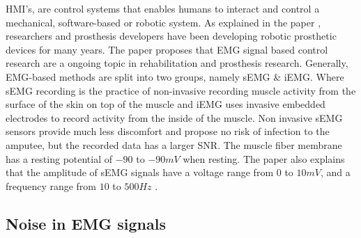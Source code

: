 \documentclass[../main.tex]{subfiles}
\begin{document}
\gls{HMI}'s, are control systems that enables humans to interact and control a mechanical, software-based or robotic system.
As explained in the paper \cite{Tech2015}, researchers and prosthesis developers have been developing robotic prosthetic devices for many years.
The paper proposes that \gls{EMG} signal based control research are a ongoing topic in rehabilitation and prosthesis research.
Generally, \gls{EMG}-based methods are split into two groups, namely \gls{sEMG} \& \gls{iEMG}.
Where \gls{sEMG} recording is the practice of non-invasive recording muscle activity from the surface of the skin on top of the muscle and \gls{iEMG} uses invasive embedded electrodes to record activity from the inside of the muscle.
Non invasive \gls{sEMG} sensors provide much less discomfort and propose no risk of infection to the amputee, but the recorded data has a larger \gls{SNR}.
The muscle fiber membrane has a resting potential of $-90$ to $-90 mV$ when resting. The paper also explains that the amplitude of sEMG signals have a voltage range from $0$ to $10 mV$, and a frequency range from $10$ to $500 Hz$ \cite{Tech2015}.

\subsection{Noise in EMG signals}
\label{sec:noise}
\end{document}
